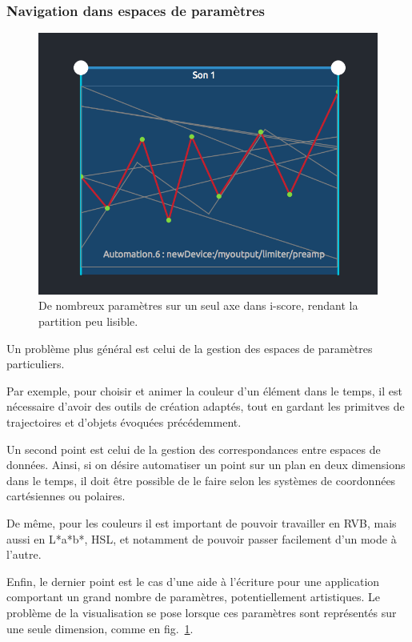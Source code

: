 \documentclass[french,12pt]{article}
\begin{document}
\subsubsection{Navigation dans espaces de paramètres}

\begin{figure}[h]
\centering
\includegraphics[scale=0.5]{images/iscore.png}
\caption{De nombreux paramètres sur un seul axe dans i-score, rendant la partition peu lisible.}
\label{fig.iscore}
\end{figure}

Un problème plus général est celui de la gestion des espaces de paramètres particuliers.

Par exemple, pour choisir et animer la couleur d'un élément dans le temps, il est nécessaire d'avoir des outils de création adaptés, tout en gardant les primitves de trajectoires et d'objets évoquées précédemment.

Un second point est celui de la gestion des correspondances entre espaces de données. Ainsi, si on désire automatiser un point sur un plan en deux dimensions dans le temps, il doit être possible de le faire selon les systèmes de coordonnées cartésiennes ou polaires.

De même, pour les couleurs il est important de pouvoir travailler en RVB, mais aussi en L*a*b*, HSL, et notamment de pouvoir passer facilement d'un mode à l'autre.

Enfin, le dernier point est le cas d'une aide à l'écriture pour une application comportant un grand nombre de paramètres, potentiellement artistiques. Le problème de la visualisation se pose lorsque ces paramètres sont représentés sur une seule dimension, comme en fig.~\ref{fig.iscore}.
\end{document}
